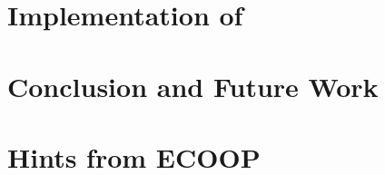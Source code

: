 \documentclass[nonatbib,preprint,numbers]{sigplanconf}
\begin{document}
\section{Implementation of \Fajita}
\label{section:implementation}


\section{Conclusion and Future Work}
\label{section:zz}


\small


\clearpage
\appendix
\section{Hints from ECOOP}
\label{section:ecoop}

\end{document}
